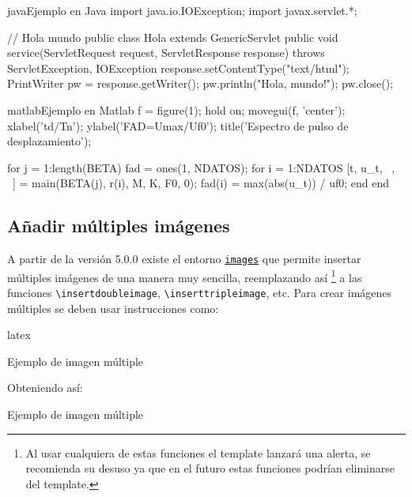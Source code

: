 \begin{sourcecode}[\label{codigo-java}]{java}{Ejemplo en Java}
import java.io.IOException; 
import javax.servlet.*;

// Hola mundo
public class Hola extends GenericServlet {
	public void service(ServletRequest request, ServletResponse response)
	throws ServletException, IOException{
		response.setContentType("text/html");
		PrintWriter pw = response.getWriter();
		pw.println("Hola, mundo!");
		pw.close();
	}
}
\end{sourcecode}

\begin{sourcecode}[\label{codigo-matlab}]{matlab}{Ejemplo en Matlab}
f = figure(1); hold on;
movegui(f, 'center');
xlabel('td/Tn'); ylabel('FAD=Umax/Uf0');
title('Espectro de pulso de desplazamiento');

for j = 1:length(BETA)
	fad = ones(1, NDATOS); %
	for i = 1:NDATOS
		[t, u_t, ~, ~] = main(BETA(j), r(i), M, K, F0, 0);
		fad(i) = max(abs(u_t)) / uf0;
	end
end	
\end{sourcecode}
	
	\subsection{Añadir múltiples imágenes}
	
	A partir de la versión 5.0.0 existe el entorno \href{http://latex.ppizarror.com/informe.html#hlp-images}{\texttt{images}} que permite insertar múltiples imágenes de una manera muy sencilla, reemplazando así \footnote{Al usar cualquiera de estas funciones el template lanzará una alerta, se recomienda su desuso ya que en el futuro estas funciones podrían eliminarse del template.} a las funciones \texttt{\textbackslash insertdoubleimage}, \texttt{\textbackslash inserttripleimage}, etc. Para crear imágenes múltiples se deben usar instrucciones como:
	
\begin{sourcecode}{latex}{}
\begin{images}[\label{imagenmultiple}]{Ejemplo de imagen múltiple}
\end{images}
\end{sourcecode}

	Obteniendo así:
	
	\begin{images}{Ejemplo de imagen múltiple}
	\end{images}

